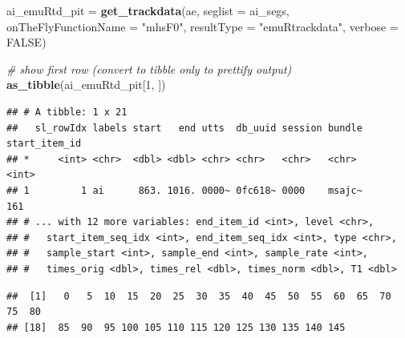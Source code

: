 \documentclass[]{book}
\newenvironment{Shaded}{\begin{snugshade}}{\end{snugshade}}
\newcommand{\CommentTok}[1]{\textcolor[rgb]{0.56,0.35,0.01}{\textit{#1}}}
\newcommand{\DataTypeTok}[1]{\textcolor[rgb]{0.13,0.29,0.53}{#1}}
\newcommand{\DecValTok}[1]{\textcolor[rgb]{0.00,0.00,0.81}{#1}}
\newcommand{\KeywordTok}[1]{\textcolor[rgb]{0.13,0.29,0.53}{\textbf{#1}}}
\newcommand{\NormalTok}[1]{#1}
\newcommand{\OperatorTok}[1]{\textcolor[rgb]{0.81,0.36,0.00}{\textbf{#1}}}
\newcommand{\OtherTok}[1]{\textcolor[rgb]{0.56,0.35,0.01}{#1}}
\newcommand{\StringTok}[1]{\textcolor[rgb]{0.31,0.60,0.02}{#1}}
\theoremstyle{definition}
\theoremstyle{definition}
\theoremstyle{definition}
\theoremstyle{remark}
\begin{document}
\begin{Shaded}
\begin{Highlighting}[]
\NormalTok{ai_emuRtd_pit =}\StringTok{ }\KeywordTok{get_trackdata}\NormalTok{(ae,}
                              \DataTypeTok{seglist =}\NormalTok{ ai_segs,}
                              \DataTypeTok{onTheFlyFunctionName =} \StringTok{"mhsF0"}\NormalTok{,}
                              \DataTypeTok{resultType =} \StringTok{"emuRtrackdata"}\NormalTok{,}
                              \DataTypeTok{verbose =} \OtherTok{FALSE}\NormalTok{)}

\CommentTok{# show first row (convert to tibble only to prettify output)}
\KeywordTok{as_tibble}\NormalTok{(ai_emuRtd_pit[}\DecValTok{1}\NormalTok{, ])}
\end{Highlighting}
\end{Shaded}

\begin{verbatim}
## # A tibble: 1 x 21
##   sl_rowIdx labels start   end utts  db_uuid session bundle start_item_id
## *     <int> <chr>  <dbl> <dbl> <chr> <chr>   <chr>   <chr>          <int>
## 1         1 ai      863. 1016. 0000~ 0fc618~ 0000    msajc~           161
## # ... with 12 more variables: end_item_id <int>, level <chr>,
## #   start_item_seq_idx <int>, end_item_seq_idx <int>, type <chr>,
## #   sample_start <int>, sample_end <int>, sample_rate <int>,
## #   times_orig <dbl>, times_rel <dbl>, times_norm <dbl>, T1 <dbl>
\end{verbatim}

\begin{Shaded}
\end{Shaded}

\begin{verbatim}
##  [1]   0   5  10  15  20  25  30  35  40  45  50  55  60  65  70  75  80
## [18]  85  90  95 100 105 110 115 120 125 130 135 140 145
\end{verbatim}

\begin{Shaded}
\end{Shaded}
\end{document}
